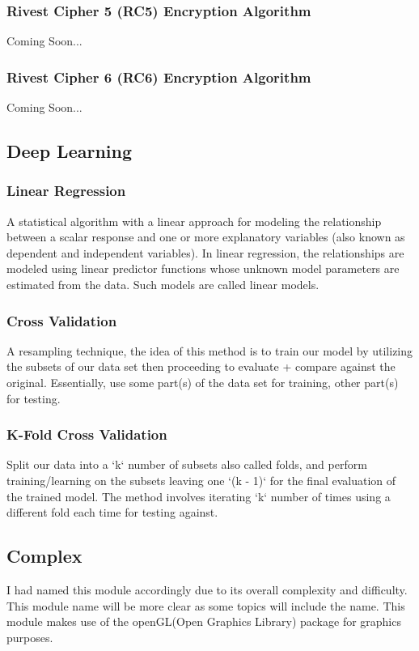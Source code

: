 \documentclass[12pt, letterpaper]{article}
\begin{document}
\begin{sloppypar}
\begin{flushleft}
\subsubsection{Rivest Cipher 5 (RC5) Encryption Algorithm}
Coming Soon...

\subsubsection{Rivest Cipher 6 (RC6) Encryption Algorithm}
Coming Soon...

\subsection{Deep Learning}
\subsubsection{Linear Regression}
A statistical algorithm with a linear approach for modeling the relationship between a 
scalar response and one or more explanatory variables (also known as dependent and 
independent variables). In linear regression, the relationships are modeled using linear 
predictor functions whose unknown model parameters are estimated from the data. Such models 
are called linear models.

\subsubsection{Cross Validation}
A resampling technique, the idea of this method is to train our model by utilizing 
the subsets of our data set then proceeding to evaluate + compare against the original.
Essentially, use some part(s) of the data set for training, other part(s) for testing.

\subsubsection{K-Fold Cross Validation}
Split our data into a `k` number of subsets also called folds, and perform
training/learning on the subsets leaving one `(k - 1)` for the final evaluation of 
the trained model. The method involves iterating `k` number of times using a different
fold each time for testing against.

\subsection{Complex}
I had named this module accordingly due to its overall complexity and difficulty. This module
name will be more clear as some topics will include the name. This module makes use of the 
openGL(Open Graphics Library) package for graphics purposes. 


\end{flushleft}
\end{sloppypar}
\end{document}
